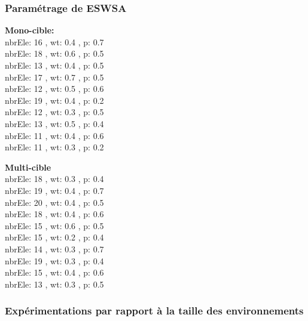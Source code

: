\subsubsection{Paramétrage de ESWSA}
\noindent
\begin{minipage}[t]{0.55\textwidth}
	\textbf{Mono-cible:} \\
nbrEle: 16 , wt: 0.4 , p: 0.7\\
nbrEle: 18 , wt: 0.6 , p: 0.5\\
nbrEle: 13 , wt: 0.4 , p: 0.5\\
nbrEle: 17 , wt: 0.7 , p: 0.5\\
nbrEle: 12 , wt: 0.5 , p: 0.6\\
nbrEle: 19 , wt: 0.4 , p: 0.2\\
nbrEle: 12 , wt: 0.3 , p: 0.5\\
nbrEle: 13 , wt: 0.5 , p: 0.4\\
nbrEle: 11 , wt: 0.4 , p: 0.6\\
nbrEle: 11 , wt: 0.3 , p: 0.2
	
\end{minipage}\hfill
\hspace{0.2cm}
\begin{minipage}[t]{0.55\textwidth}
	\textbf{Multi-cible}\\
nbrEle: 18 , wt: 0.3 , p: 0.4\\
nbrEle: 19 , wt: 0.4 , p: 0.7\\
nbrEle: 20 , wt: 0.4 , p: 0.5\\
nbrEle: 18 , wt: 0.4 , p: 0.6\\
nbrEle: 15 , wt: 0.6 , p: 0.5\\
nbrEle: 15 , wt: 0.2 , p: 0.4\\
nbrEle: 14 , wt: 0.3 , p: 0.7\\
nbrEle: 19 , wt: 0.3 , p: 0.4\\
nbrEle: 15 , wt: 0.4 , p: 0.6\\
nbrEle: 13 , wt: 0.3 , p: 0.5
	
\end{minipage}\hfill


\subsubsection{Expérimentations par rapport à la taille des environnements}
